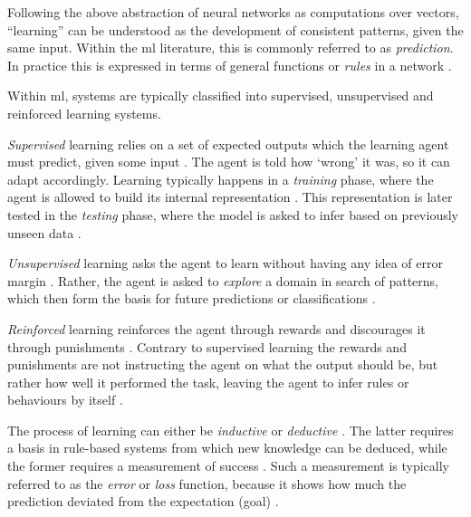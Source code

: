 \documentclass[report.tex]{subfiles}
\begin{document}
Following the above abstraction of neural networks as computations over vectors,
``learning''  can be understood as the development of consistent
patterns, given the same input.
Within the \gls{ml} literature, this is commonly referred to as 
\textit{prediction}. 
In practice this is expressed in terms of general functions or
\textit{rules}  in a network \cite[p. 704.]{Russel2007}.

Within \gls{ml}, systems are typically classified into
supervised, 
unsupervised  and reinforced learning systems.

\textit{Supervised} learning relies on a set of expected outputs which 
the learning \gls{agent} must predict, given some input \cite{Russel2007}.
The \gls{agent} is told how `wrong' it was, so it can adapt accordingly.
Learning typically happens in a \textit{training} 
phase, where the \gls{agent} is allowed to build its internal representation 
\cite{Russel2007}.
This representation is later tested in the \textit{testing} phase, 
where the model is asked to infer based on previously unseen data \cite{Russel2007}.

\textit{Unsupervised} learning asks the \gls{agent} to learn without
having any idea of error margin \cite{Russel2007}.
Rather, the \gls{agent} is asked to \textit{explore} a domain in search of
patterns, which then form the basis for future predictions or classifications
\cite{Russel2007}.

\textit{Reinforced} learning reinforces the \gls{agent} through
rewards and discourages it through punishments \cite{Russel2007}.
Contrary to supervised learning the rewards and punishments are not
instructing the agent on what the output should be, but rather how well
it performed the task, leaving the \gls{agent} to infer rules or
behaviours by itself \cite[p. 873]{Russel2007}.

The process of learning can either be \textit{inductive}
or \textit{deductive}  \cite[p. 704]{Russel2007}.
The latter requires a basis in rule-based systems from which new knowledge can
be deduced, while the former requires a measurement of success \cite[p. 705]{Russel2007}.
Such a measurement is typically referred to as the \textit{error} or \textit{loss}
function,
because it shows how much the prediction deviated from the expectation (goal)
\cite{Russel2007}.
\end{document}
